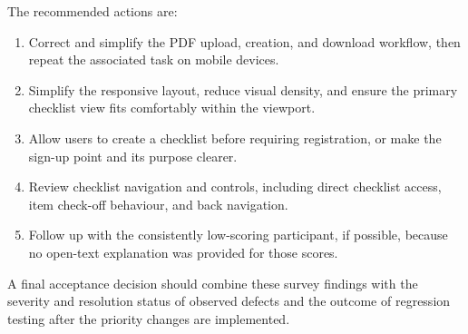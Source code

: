 The recommended actions are:

\begin{enumerate}
    \item Correct and simplify the PDF upload, creation, and download workflow,
          then repeat the associated task on mobile devices.
    \item Simplify the responsive layout, reduce visual density, and ensure the
          primary checklist view fits comfortably within the viewport.
    \item Allow users to create a checklist before requiring registration, or
          make the sign-up point and its purpose clearer.
    \item Review checklist navigation and controls, including direct checklist
          access, item check-off behaviour, and back navigation.
    \item Follow up with the consistently low-scoring participant, if possible,
          because no open-text explanation was provided for those scores.
\end{enumerate}

A final acceptance decision should combine these survey findings with the
severity and resolution status of observed defects and the outcome of regression
testing after the priority changes are implemented.


